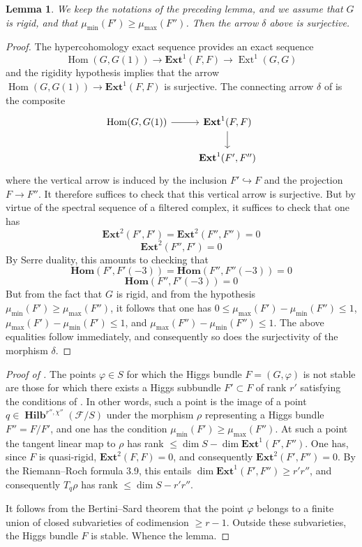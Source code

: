 \documentclass[12pt,english]{smfart}%
\theoremstyle{plain}
\newtheorem{lemma}[theorem]{Lemma}
\theoremstyle{definition}
\theoremstyle{remark}
\DeclareMathOperator{\Hom}{Hom}
\DeclareMathOperator{\Ext}{Ext}
\DeclareMathOperator{\Hilb}{\mathbf{Hilb}}
\newcommand{\BHom}{\mathbf{Hom}}
\newcommand{\BExt}{\mathbf{Ext}}
\newcommand{\origpage}[1]{\marginnote{\scriptsize\itshape p.~#1}}
\begin{document}
\begin{lemma}\label{lem:delta-surj}
We keep the notations of the preceding lemma, and we assume that $G$ is rigid, and that $\mu_{\min}(F')\geq\mu_{\max}(F'')$. Then the arrow $\delta$ above is surjective.
\end{lemma}

\begin{proof}
The hypercohomology exact sequence provides an exact sequence
\[
\Hom(G,G(1)) \longrightarrow \BExt^{1}(F,F) \longrightarrow \Ext^{1}(G,G)
\]
and the rigidity hypothesis implies that the arrow $\Hom(G,G(1))\to\BExt^{1}(F,F)$ is surjective. The connecting arrow $\delta$ of  is the composite
\[
\begin{tikzcd}
\Hom(G,G(1)) \arrow[r] & \BExt^{1}(F,F) \arrow[d] \\
& \BExt^{1}(F',F'')
\end{tikzcd}
\]
where the vertical arrow is induced by the inclusion $F'\hookrightarrow F$ and the projection $F\to F''$. It therefore suffices to check that this vertical arrow is surjective. But by virtue of the spectral sequence of a filtered complex, it suffices to check that one has
\[
\BExt^{2}(F',F') = \BExt^{2}(F'',F'') = 0
\]
\[
\BExt^{2}(F'',F') = 0
\]
By Serre duality, this amounts to checking that
\[
\BHom(F',F'(-3)) = \BHom(F'',F''(-3)) = 0
\]
\[
\BHom(F'',F'(-3)) = 0
\]
\origpage{653}%
But from the fact that $G$ is rigid, and from the hypothesis $\mu_{\min}(F')\geq\mu_{\max}(F'')$, it follows that one has $0\leq\mu_{\max}(F')-\mu_{\min}(F'')\leq 1$, $\mu_{\max}(F')-\mu_{\min}(F')\leq 1$, and $\mu_{\max}(F'')-\mu_{\min}(F'')\leq 1$. The above equalities follow immediately, and consequently so does the surjectivity of the morphism $\delta$.
\end{proof}

\begin{proof}[Proof of ]
The points $\varphi\in S$ for which the Higgs bundle $F=(G,\varphi)$ is not stable are those for which there exists a Higgs subbundle $F'\subset F$ of rank $r'$ satisfying the conditions of . In other words, such a point is the image of a point $q\in\Hilb^{r'',\chi''}(\mathscr{F}/S)$ under the morphism $\rho$ representing a Higgs bundle $F''=F/F'$, and one has the condition $\mu_{\min}(F')\geq\mu_{\max}(F'')$. At such a point the tangent linear map to $\rho$ has rank $\leq\dim S-\dim\BExt^{1}(F',F'')$. One has, since $F$ is quasi-rigid, $\BExt^{2}(F,F)=0$, and consequently $\BExt^{2}(F',F'')=0$. By the Riemann--Roch formula 3.9, this entails $\dim\BExt^{1}(F',F'')\geq r'r''$, and consequently $T_{q}\rho$ has rank $\leq\dim S-r'r''$.

It follows from the Bertini--Sard theorem that the point $\varphi$ belongs to a finite union of closed subvarieties of codimension $\geq r-1$. Outside these subvarieties, the Higgs bundle $F$ is stable. Whence the lemma.
\end{proof}
\end{document}
